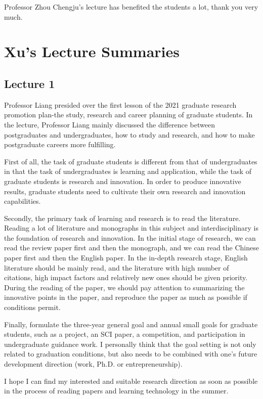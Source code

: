 \documentclass[UTF-8]{ctexart}
\begin{document}
Professor Zhou Chengju’s lecture has benefited the students a lot, thank you very much. 


\section{Xu's Lecture Summaries}

\subsection{Lecture 1}
Professor Liang presided over the first lesson of the 2021 graduate research promotion plan-the study, research and career planning of graduate students. In the lecture, Professor Liang mainly discussed the difference between postgraduates and undergraduates, how to study and research, and how to make postgraduate careers more fulfilling.

First of all, the task of graduate students is different from that of undergraduates in that the task of undergraduates is learning and application, while the task of graduate students is research and innovation. In order to produce innovative results, graduate students need to cultivate their own research and innovation capabilities.

Secondly, the primary task of learning and research is to read the literature. Reading a lot of literature and monographs in this subject and interdisciplinary is the foundation of research and innovation. In the initial stage of research, we can read the review paper first and then the monograph, and we can read the Chinese paper first and then the English paper. In the in-depth research stage, English literature should be mainly read, and the literature with high number of citations, high impact factors and relatively new ones should be given priority. During the reading of the paper, we should pay attention to summarizing the innovative points in the paper, and reproduce the paper as much as possible if conditions permit.

Finally, formulate the three-year general goal and annual small goals for graduate students, such as a project, an SCI paper, a competition, and participation in undergraduate guidance work. I personally think that the goal setting is not only related to graduation conditions, but also needs to be combined with one's future development direction (work, Ph.D. or entrepreneurship).

I hope I can find my interested and suitable research direction as soon as possible in the process of reading papers and learning technology in the summer.
\end{document}
